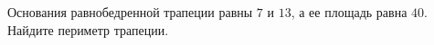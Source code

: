 \begin{ex}
	\begin{condition}
		Основания равнобедренной трапеции равны \( 7  \) и \( 13 \), а ее площадь равна \( 40 \). Найдите периметр трапеции.
	\end{condition}
\end{ex}